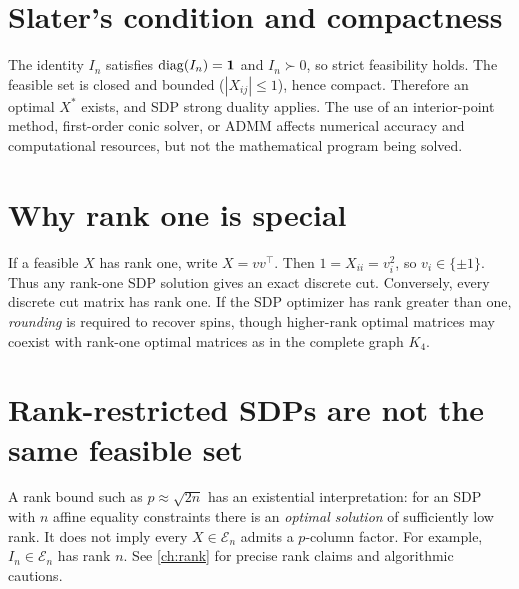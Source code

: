 \section{Slater's condition and compactness}
The identity $I_n$ satisfies $\operatorname{diag}(I_n)=\boldsymbol{1}$ and $I_n\succ0$, so strict feasibility holds. The feasible set is closed and bounded ($|X_{ij}|\le1$), hence compact. Therefore an optimal $X^*$ exists, and SDP strong duality applies. The use of an interior-point method, first-order conic solver, or ADMM affects numerical accuracy and computational resources, but not the mathematical program being solved.

\section{Why rank one is special}
If a feasible $X$ has rank one, write $X=vv^\top$. Then $1=X_{ii}=v_i^2$, so $v_i\in\{\pm1\}$. Thus any rank-one SDP solution gives an exact discrete cut. Conversely, every discrete cut matrix has rank one. If the SDP optimizer has rank greater than one, \emph{rounding} is required to recover spins, though higher-rank optimal matrices may coexist with rank-one optimal matrices as in the complete graph $K_4$.

\section{Rank-restricted SDPs are not the same feasible set}
A rank bound such as $p\approx\sqrt{2n}$ has an existential interpretation: for an SDP with $n$ affine equality constraints there is an \emph{optimal solution} of sufficiently low rank. It does not imply every $X\in\mathcal E_n$ admits a $p$-column factor. For example, $I_n\in\mathcal E_n$ has rank $n$. See \cref{ch:rank} for precise rank claims and algorithmic cautions.
